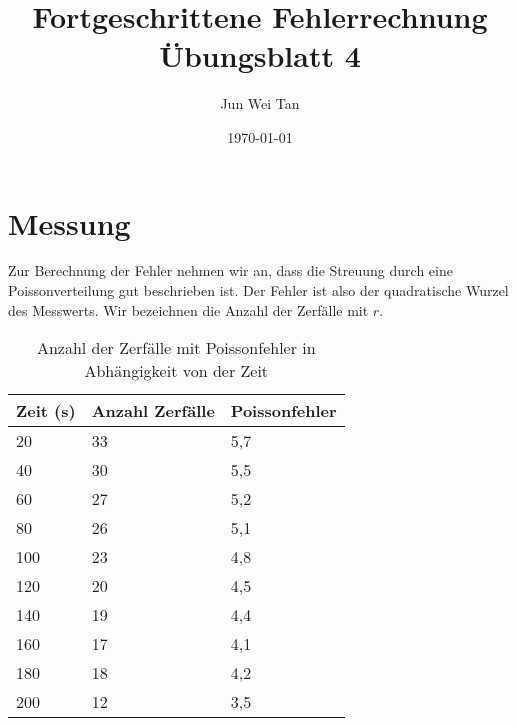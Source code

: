 \documentclass[prb,12pt]{revtex4-2}
\theoremstyle{definition}
\theoremstyle{definition}
\begin{document}
\title{Fortgeschrittene Fehlerrechnung Übungsblatt 4}
	\author{Jun Wei Tan}
	\date{\today}
	\maketitle

\section{Messung}
Zur Berechnung der Fehler nehmen wir an, dass die Streuung durch eine Poissonverteilung gut beschrieben ist. Der Fehler ist also der quadratische Wurzel des Messwerts. Wir bezeichnen die Anzahl der Zerfälle mit $r$.
\begin{table}[h]
\begin{center}
	\begin{tabular}{p{3cm}p{3cm}p{3cm}}
		\toprule
		\textbf{Zeit (s)} & \textbf{Anzahl Zerfälle} & \textbf{Poissonfehler} \\\midrule
	20 & 33 & 5,7 \\\midrule
40 & 30 & 5,5 \\\midrule
60 & 27 & 5,2 \\\midrule
80 & 26 & 5,1 \\\midrule
100 & 23 & 4,8 \\\midrule
120 & 20 & 4,5 \\\midrule
140 & 19 & 4,4 \\\midrule
160 & 17 & 4,1 \\\midrule
180 & 18 & 4,2 \\\midrule
200 & 12 & 3,5 \\\bottomrule
	\end{tabular}
\end{center}
\caption{Anzahl der Zerfälle mit Poissonfehler in Abhängigkeit von der Zeit}
\label{tab:1}
\end{table}
\end{document}

